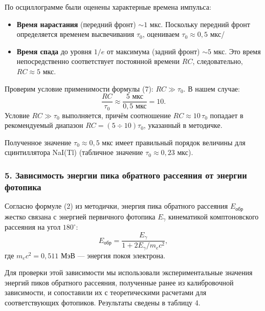 \documentclass[12pt,a4paper]{article}
\begin{document}
По осциллограмме были оценены характерные времена импульса:
\begin{itemize}
    \item \textbf{Время нарастания} (передний фронт) $\sim 1$ мкс. Поскольку передний фронт определяется временем высвечивания $\tau_0$, оцениваем $\tau_0 \approx 0,5$ мкс/%
    \item \textbf{Время спада} до уровня $1/e$ от максимума (задний фронт) $\sim 5$ мкс. Это время непосредственно соответствует постоянной времени $RC$, следовательно, $RC \approx 5$ мкс.
\end{itemize}

Проверим условие применимости формулы (7): $RC \gg \tau_0$. В нашем случае:
\begin{equation}
    \frac{RC}{\tau_0} \approx \frac{5 \text{ мкс}}{0{,}5 \text{ мкс}} = 10.
\end{equation}
Условие $RC \gg \tau_0$ выполняется, причём соотношение $RC \approx 10\,\tau_0$ попадает в рекомендуемый диапазон $RC = (5 \div 10)\tau_0$, указанный в методичке.

Полученное значение $\tau_0 \approx 0{,}5$ мкс имеет правильный порядок величины для сцинтиллятора NaI(Tl) (табличное значение $\tau_0 \approx 0{,}23$ мкс).%


\subsubsection*{5. Зависимость энергии пика обратного рассеяния от энергии фотопика}

Согласно формуле (2) из методички, энергия пика обратного рассеяния $E_{\text{обр}}$ жестко связана с энергией первичного фотопика $E_\gamma$ кинематикой комптоновского рассеяния на угол $180^\circ$:
\begin{equation}
    E_{\text{обр}} = \frac{E_\gamma}{1 + 2E_\gamma / m_e c^2},
\end{equation}
где $m_e c^2 = 0,511$ МэВ --- энергия покоя электрона.

Для проверки этой зависимости мы использовали экспериментальные значения энергий пиков обратного рассеяния, полученные ранее из калибровочной зависимости, и сопоставили их с теоретическими расчетами для соответствующих фотопиков. Результаты сведены в таблицу 4.
\end{document}
